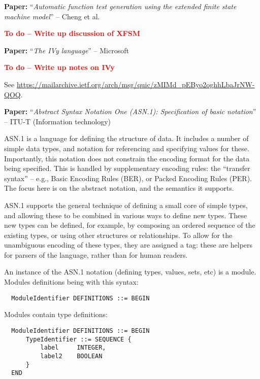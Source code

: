 \documentclass[10pt,a4paper]{article}
\newcommand{\todo}[1]{\textbf{\textcolor{red}{To do -- #1}}}
\newcommand{\paper}[3]{\vspace{4mm}\noindent\textbf{Paper:} ``\textit{#1}'' -- #2 \cite{#3}\vspace{3mm}}
\begin{document}
\paper{Automatic function test generation using the extended finite state machine model}
      {Cheng et al.}{cheng1993automatic}

\todo{Write up discussion of XFSM}

\paper{The IVy language}{Microsoft}{ivyspec}

\todo{Write up notes on IVy}

See \url{https://mailarchive.ietf.org/arch/msg/quic/zMIMd_pEByo2oghhLbaJrNW-QOQ}.

\paper{Abstract Syntax Notation One (ASN.1): Specification of basic notation}{ITU-T (Information technology)}{x680}

ASN.1 is a language for defining the structure of data. It includes a number of simple
data types, and notation for referencing and specifying values for these. Importantly,
this notation does not constrain the encoding format for the data being specified. This
is handled by supplementary encoding rules: the ``transfer syntax'' -- e.g., Basic
Encoding Rules (BER), or Packed Encoding Rules (PER). The focus here is on the abstract
notation, and the semantics it supports.

ASN.1 supports the general technique of defining a small core of simple types, and
allowing these to be combined in various ways to define new types. These new types can
be defined, for example, by composing an ordered sequence of the existing types, or using
other structures or relationships. To allow for the unambiguous encoding of these types,
they are assigned a tag: these are helpers for parsers of the language, rather than for
human readers.

An instance of the ASN.1 notation (defining types, values, sets, etc) is a
module. Modules definitions being with this syntax:

\begin{verbatim}
  ModuleIdentifier DEFINITIONS ::= BEGIN
\end{verbatim}

Modules contain type definitions:

\begin{verbatim}
  ModuleIdentifier DEFINITIONS ::= BEGIN
      TypeIdentifier ::= SEQUENCE {
          label     INTEGER,
          label2    BOOLEAN
      }
  END
\end{verbatim}
\end{document}
